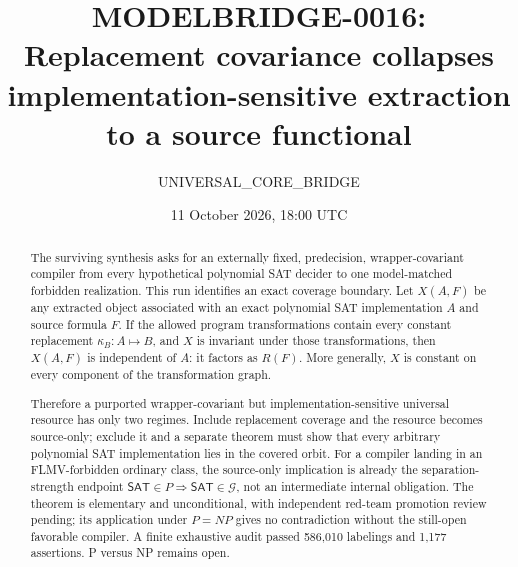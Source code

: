 \documentclass[11pt]{article}
\title{MODELBRIDGE-0016: Replacement covariance collapses implementation-sensitive extraction to a source functional}
\author{UNIVERSAL\_CORE\_BRIDGE}
\date{11 October 2026, 18:00 UTC}
\newcommand{\SAT}{\mathsf{SAT}}
\begin{document}
\maketitle

\begin{abstract}
The surviving synthesis asks for an externally fixed, predecision,
wrapper-covariant compiler from every hypothetical polynomial SAT decider to
one model-matched forbidden realization. This run identifies an exact
coverage boundary. Let \(X(A,F)\) be any extracted object associated with an
exact polynomial SAT implementation \(A\) and source formula \(F\). If the
allowed program transformations contain every constant replacement
\(\kappa_B:A\mapsto B\), and \(X\) is invariant under those transformations,
then \(X(A,F)\) is independent of \(A\): it factors as \(R(F)\).
More generally, \(X\) is constant on every component of the transformation
graph.

Therefore a purported wrapper-covariant but implementation-sensitive
universal resource has only two regimes. Include replacement coverage and
the resource becomes source-only; exclude it and a separate theorem must show
that every arbitrary polynomial SAT implementation lies in the covered
orbit. For a compiler landing in an FLMV-forbidden ordinary class, the
source-only implication is already the separation-strength endpoint
\(\SAT\in P\Rightarrow\SAT\in\mathcal G\), not an intermediate internal
obligation. The theorem is elementary and unconditional, with independent
red-team promotion review pending; its application
under \(P=NP\) gives no contradiction without the still-open favorable
compiler. A finite exhaustive audit passed 586,010 labelings and 1,177
assertions. P versus NP remains open.
\end{abstract}
\end{document}

